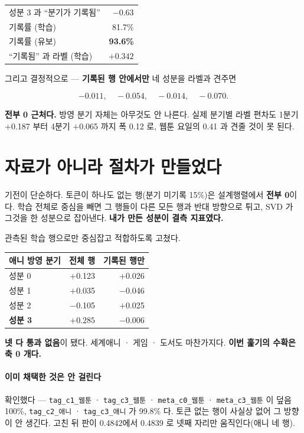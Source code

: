 \documentclass[10pt]{article}
\begin{document}
\begin{center}\small
\begin{tabular}{lr}
\hline
성분 3 과 ``분기가 기록됨'' & $-$0.63 \\
기록률 (학습) & 81.7\% \\
기록률 (유보) & \textbf{93.6\%} \\
``기록됨'' 과 라벨 (학습) & $\mathbf{+0.342}$ \\
\hline
\end{tabular}
\end{center}

그리고 결정적으로 --- \textbf{기록된 행 안에서만} 네 성분을 라벨과 견주면

\[ -0.011,\quad -0.054,\quad -0.014,\quad -0.070. \]

\textbf{전부 0 근처다.} 방영 분기 자체는 아무것도 안 나른다. 실제 분기별
라벨 편차도 1분기 $+$0.187 부터 4분기 $+$0.065 까지 폭 0.12 로, 웹툰
요일의 0.41 과 견줄 것이 못 된다.

\section{자료가 아니라 절차가 만들었다}

기전이 단순하다. 토큰이 하나도 없는 행(분기 미기록 15\%)은 설계행렬에서
\textbf{전부 0}이다. 학습 전체로 중심을 빼면 그 행들이 다른 모든 행과
반대 방향으로 튀고, SVD 가 그것을 한 성분으로 잡아낸다. \textbf{내가 만든
성분이 결측 지표였다.}

관측된 학습 행으로만 중심잡고 적합하도록 고쳤다.

\begin{center}\small
\begin{tabular}{lrr}
\hline
애니 방영 분기 & 전체 행 & 기록된 행만 \\
\hline
성분 0 & $+$0.123 & $+$0.026 \\
성분 1 & $+$0.035 & $-$0.046 \\
성분 2 & $-$0.105 & $+$0.025 \\
\textbf{성분 3} & $\mathbf{+0.285}$ & $\mathbf{-0.006}$ \\
\hline
\end{tabular}
\end{center}

\textbf{넷 다 통과 없음}이 됐다. 세계애니 · 게임 · 도서도 마찬가지다.
\textbf{이번 훑기의 수확은 축 0 개다.}

\paragraph{이미 채택한 것은 안 걸린다} 확인했다 --- \texttt{tag\_c1\_웹툰} ·
\texttt{tag\_c3\_웹툰} · \texttt{meta\_c0\_웹툰} · \texttt{meta\_c3\_웹툰} 이
덮음 100\%, \texttt{tag\_c2\_애니} · \texttt{tag\_c3\_애니} 가 99.8\% 다.
토큰 없는 행이 사실상 없어 그 방향이 안 생긴다. 고친 뒤 판이 0.4842에서
0.4839 로 넷째 자리만 움직인다(애니 네 행).
\end{document}
